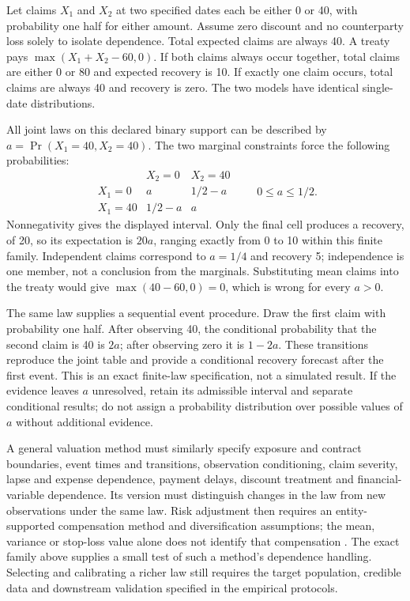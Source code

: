 Let claims \(X_1\) and \(X_2\) at two specified dates each be either 0
or 40, with probability one half for either amount. Assume zero discount
and no counterparty loss solely to isolate dependence. Total expected
claims are always 40. A treaty pays \(\max(X_1+X_2-60,0)\). If both
claims always occur together, total claims are either 0 or 80 and expected
recovery is 10. If exactly one claim occurs, total claims are always 40
and recovery is zero. The two models have identical single-date
distributions.

All joint laws on this declared binary support can be described by
\(a=\Pr(X_1=40,X_2=40)\). The two marginal constraints force the
following probabilities:
\[
\begin{array}{c|cc}
 & X_2=0 & X_2=40\\ \hline
 X_1=0 & a & 1/2-a\\
 X_1=40 & 1/2-a & a
\end{array}
\qquad 0\leq a\leq 1/2.
\]
Nonnegativity gives the displayed interval. Only the final cell produces
a recovery, of 20, so its expectation is \(20a\), ranging exactly from
0 to 10 within this finite family. Independent claims correspond to
\(a=1/4\) and recovery 5; independence is one member, not a conclusion
from the marginals. Substituting mean claims into the treaty would give
\(\max(40-60,0)=0\), which is wrong for every \(a>0\).

The same law supplies a sequential event procedure. Draw the first claim
with probability one half. After observing 40, the conditional probability
that the second claim is 40 is \(2a\); after observing zero it is
\(1-2a\). These transitions reproduce the joint table and provide a
conditional recovery forecast after the first event. This is an exact
finite-law specification, not a simulated result. If the evidence leaves
\(a\) unresolved, retain its admissible interval and separate conditional
results; do not assign a probability distribution over possible values of
\(a\) without additional evidence.

A general valuation method must similarly specify exposure and contract
boundaries, event times and transitions, observation conditioning, claim
severity, lapse and expense dependence, payment delays, discount treatment
and financial-variable dependence. Its version must distinguish changes
in the law from new observations under the same law. Risk adjustment then
requires an entity-supported compensation method and diversification
assumptions; the mean, variance or stop-loss value alone does not identify
that compensation \citep[IFRS~17.B65,B74--78,B86--89]{eu20231803}.
The exact family above supplies a small test of such a method's dependence
handling. Selecting and calibrating a richer law still requires the target
population, credible data and downstream validation specified in the
empirical protocols.
